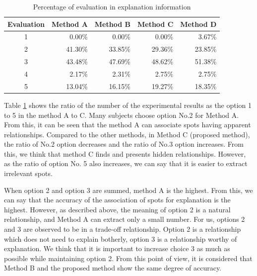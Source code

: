\documentclass[journal]{IAENGtran}
\begin{document}
\begin{table}[t]
  \caption{Percentage of evaluation in explanation information}
  \label{table:Percentage of evaluation in explanation information}
  \centering
  \begin{tabular}{c|r|r|r|r}
  \hline
  Evaluation & \multicolumn{1}{c|}{Method A} & \multicolumn{1}{c|}{Method B} & \multicolumn{1}{c|}{Method C} & \multicolumn{1}{c}{Method D} \\ \hline
  1  & 0.00\%                     & 0.00\%                     & 0.00\%                     & 3.67\%                    \\
  2  & 41.30\%                    & 33.85\%                    & 29.36\%                    & 23.85\%                   \\
  3  & 43.48\%                    & 47.69\%                    & 48.62\%                    & 51.38\%                   \\
  4  & 2.17\%                     & 2.31\%                     & 2.75\%                     & 2.75\%                    \\
  5  & 13.04\%                    & 16.15\%                    & 19.27\%                    & 18.35\%                   \\ \hline
  \end{tabular}
\end{table}

Table \ref{table:Percentage of evaluation in explanation information} shows the ratio of the number of the experimental results as the option 1 to 5 in the method A to C.
Many subjects choose option No.2 for Method A. From this, it can be seen that the method A can associate spots having apparent relationships.
Compared to the other methods, in Method C (proposed method), the ratio of No.2 option decreases and the ratio of No.3 option increases. From this, we think that method C finds and presents hidden relationships. However, as the ratio of option No. 5 also increases, we can say that it is easier to extract irrelevant spots.

When option 2 and option 3 are summed, method A is the highest. From this, we can say that the accuracy of the association of spots for explanation is the highest. However, as described above, the meaning of option 2 is a natural relationship, and Method A can extract only a small number.
For us, options 2 and 3 are observed to be in a trade-off relationship. Option 2 is a relationship which does not need to explain botherly, option 3 is a relationship worthy of explanation.
We think that it is important to increase choice 3 as much as possible while maintaining option 2. From this point of view, it is considered that Method B and the proposed method show the same degree of accuracy.
\end{document}
